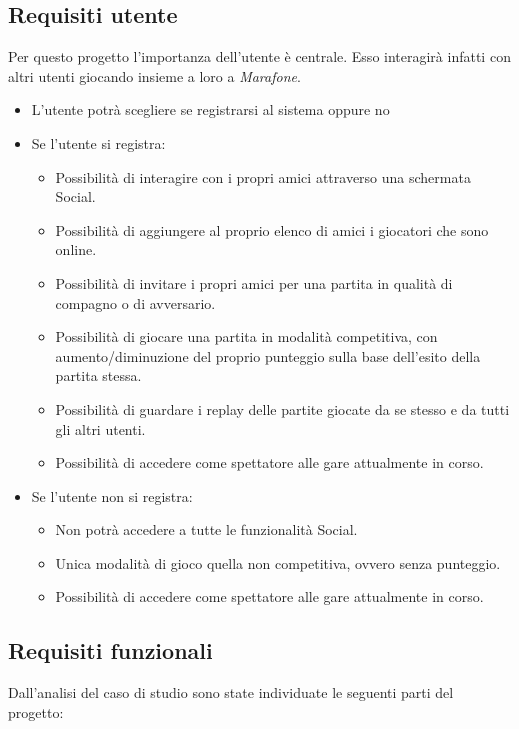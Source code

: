          \subsection {Requisiti utente}\label{subsec:requirements:business}
         Per questo progetto l'importanza dell'utente è centrale. Esso interagirà infatti con altri utenti giocando insieme a loro a \textit{Marafone}.
         \begin{itemize}
         \item L'utente potrà scegliere se registrarsi al sistema oppure no
	 \item Se l'utente si registra:

	 \begin{itemize}
	 \item Possibilità di interagire con i propri amici attraverso una schermata Social.
	 \item Possibilità di aggiungere al proprio elenco di amici i giocatori che sono online.
	 \item Possibilità di invitare i propri amici per una partita in qualità di compagno o di avversario.
	 \item Possibilità di giocare una partita in modalità competitiva, con aumento/diminuzione del proprio punteggio sulla base dell'esito della partita stessa.
	 \item Possibilità di guardare i replay delle partite giocate da se stesso e da tutti gli altri utenti.
	 \item Possibilità di accedere come spettatore alle gare attualmente in corso.
	\end {itemize}

	\item Se l'utente non si registra:

	\begin{itemize}
	\item Non potrà accedere a tutte le funzionalità Social.
	\item Unica modalità di gioco quella non competitiva, ovvero senza punteggio.
	\item Possibilità di accedere come spettatore alle gare attualmente in corso.
	\end {itemize}

	\end {itemize}
         \clearpage
             \subsection {Requisiti funzionali}\label{subsec:requirements:functional}
             Dall'analisi del caso di studio sono state individuate le seguenti parti del progetto:

